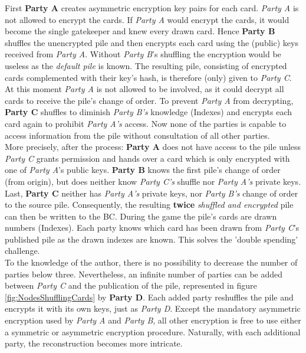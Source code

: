 \noindent First \textbf{Party A} creates asymmetric encryption key pairs for each card.
\textit{Party A} is not allowed to encrypt the cards.
If \textit{Party A} would encrypt the cards, it would become the single gatekeeper and knew every drawn card.
Hence \textbf{Party B} shuffles the unencrypted pile and then encrypts each card using the (public) keys received from \textit{Party A}.
Without \textit{Party B}'s shuffling the encryption would be useless as the \textit{default pile} is known.
The resulting pile, consisting of encrypted cards complemented with their key's hash, is therefore (only) given to \textit{Party C}.
At this moment \textit{Party A} is not allowed to be involved, as it could decrypt all cards to receive the pile's change of order.
To prevent \textit{Party A} from decrypting, \textbf{Party C} shuffles to diminish \textit{Party B's} knowledge (Indexes) and encrypts each card again to prohibit \textit{Party A's} access.
Now none of the parties is capable to access information from the pile without consultation of all other parties. \\
More precisely, after the process: \textbf{Party A} does not have access to the pile unless \textit{Party C}
grants permission and hands over a card which is only encrypted with one of \textit{Party A}'s public keys.
\textbf{Party B} knows the first pile's change of order (from origin), but does neither know \textit{Party C's} shuffle nor \textit{Party A's} private keys.
Last, \textbf{Party C} neither has \textit{Party A's} private keys, nor \textit{Party B's} change of order to the source pile.
Consequently, the resulting \textbf{twice} \textit{shuffled and encrypted} pile can then be written to the \gls{BC}.
During the game the pile's cards are drawn numbers (Indexes).
Each party knows which card has been drawn from \textit{Party C}'s published pile as the drawn indexes are known.
This solves the 'double spending' challenge. \\
To the knowledge of the author, there is no possibility to decrease the number of parties below three.
Nevertheless, an infinite number of parties can be added between \textit{Party C} and the publication of the pile, represented in figure \ref{fig:NodesShufflingCards} by \textbf{Party D}.
Each added party reshuffles the pile and encrypts it with its own keys, just as \textit{Party D}.
Except the mandatory asymmetric encryption used by \textit{Party A} and \textit{Party B}, all other encryption is free to use either a symmetric or asymmetric encryption procedure.
Naturally, with each additional party, the reconstruction becomes more intricate.
